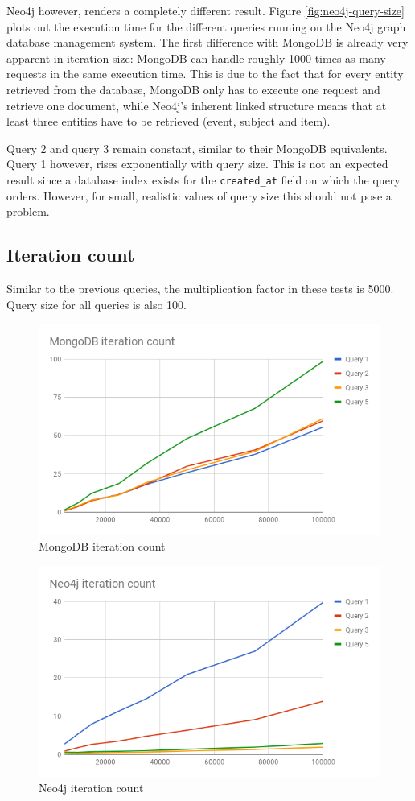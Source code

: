 Neo4j however, renders a completely different result.
Figure \ref{fig:neo4j-query-size} plots out the execution time for the different queries running on the Neo4j graph database management system.
The first difference with MongoDB is already very apparent in iteration size: MongoDB can handle roughly 1000 times as many requests in the same execution time.
This is due to the fact that for every entity retrieved from the database, MongoDB only has to execute one request and retrieve one document, while Neo4j's inherent linked structure means that at least three entities have to be retrieved (event, subject and item).

Query 2 and query 3 remain constant, similar to their MongoDB equivalents.
Query 1 however, rises exponentially with query size.
This is not an expected result since a database index exists for the \texttt{created\_at} field on which the query orders.
However, for small, realistic values of query size this should not pose a problem.

\subsection{Iteration count}
\label{subsec:iteration-size}

Similar to the previous queries, the multiplication factor in these tests is 5000.
Query size for all queries is also 100.

\begin{figure}
  \centering
  \includegraphics[width=.8\textwidth]{img/mongodb-iteration-count.png}
  \caption{MongoDB iteration count}
  \label{fig:mongodb-iteration-count}
\end{figure}

\begin{figure}
  \centering
  \includegraphics[width=.8\textwidth]{img/neo4j-iteration-count.png}
  \caption{Neo4j iteration count}
  \label{fig:neo4j-iteration-count}
\end{figure}

